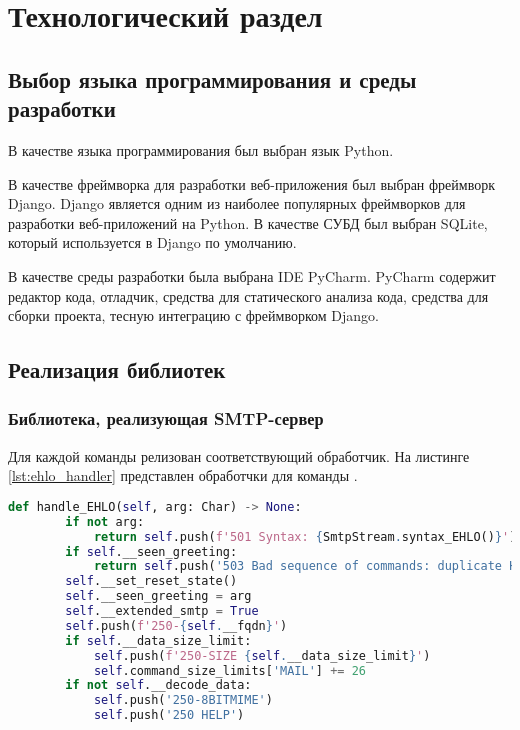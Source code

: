 \chapter{Технологический раздел}

\section{Выбор языка программирования и среды разработки}

В качестве языка программирования был выбран язык Python. 

В качестве фреймворка для разработки веб-приложения был выбран фреймворк Django. Django является одним из наиболее популярных фреймворков для разработки веб-приложений на Python. В качестве СУБД был выбран SQLite, который используется в Django по умолчанию.

В качестве среды разработки была выбрана IDE PyCharm. PyCharm содержит редактор кода, отладчик, средства для статического анализа кода, средства для сборки проекта, тесную интеграцию с фреймворком Django.

\section{Реализация библиотек}

\subsection{Библиотека, реализующая SMTP-сервер}

Для каждой команды релизован соответствующий обработчик. На листинге \ref{lst:ehlo_handler} представлен обработчки для команды .

\begin{lstlisting}[gobble=8, language=Python, caption={Обработчик для команды \code{EHLO}\label{lst:ehlo_handler}}]
	def handle_EHLO(self, arg: Char) -> None:
		if not arg:
			return self.push(f'501 Syntax: {SmtpStream.syntax_EHLO()}')
		if self.__seen_greeting:
			return self.push('503 Bad sequence of commands: duplicate HELO/EHLO')
		self.__set_reset_state()
		self.__seen_greeting = arg
		self.__extended_smtp = True
		self.push(f'250-{self.__fqdn}')
		if self.__data_size_limit:
			self.push(f'250-SIZE {self.__data_size_limit}')
			self.command_size_limits['MAIL'] += 26
		if not self.__decode_data:
			self.push('250-8BITMIME')
			self.push('250 HELP')
\end{lstlisting}

